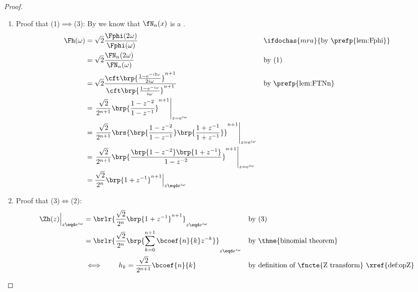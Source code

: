 \begin{proof}
\begin{enumerate}
  \item Proof that (1)$\implies$(3):
        By  we know that $\fN_n(x)$ is a .
        \begin{align*}
          \Fh(\omega)
            &= \sqrt{2}\frac{\Fphi(2\omega)}{\Fphi(\omega)}
            && \ifdochas{mra}{\text{by \prefp{lem:Fphi}}}
          \\&= \sqrt{2}\frac{\FN_n(2\omega)}{\FN_n(\omega)}
            && \text{by (1)}
          \\&= \sqrt{2}\frac{{\cft}\brp{\frac{1-e^{-i2\omega}}{2i\omega}}^{n+1}}
                            {{\cft}\brp{\frac{1-e^{-i\omega}}{i\omega}}^{n+1}}
            && \text{by \prefp{lem:FTNn}}
          \\&= \left.\frac{\sqrt{2}}{2^{n+1}}
               \brp{\frac{1-z^{-2}}{1-z^{-1}}}^{n+1}\right|_{z=e^{i\omega}}
          \\&= \left.\frac{\sqrt{2}}{2^{n+1}}
               \brs{\brp{\frac{1-z^{-2}}{1-z^{-1}}}
               \brp{\frac{1+z^{-1}}{1+z^{-1}}}}^{n+1}\right|_{z=e^{i\omega}}
          \\&= \left.\frac{\sqrt{2}}{2^{n+1}}
               \brp{\frac{ \brp{1-z^{-2}}  \brp{1+z^{-1}}}{1-z^{-2}}}^{n+1}\right|_{z=e^{i\omega}}
          \\&= \frac{\sqrt{2}}{2^n}\brp{1+z^{-1}}^{n+1}\Big|_{z\eqd e^{i\omega}}
        \end{align*}

  \item Proof that (3)$\iff$(2):\\
    \begin{align*}
      \Zh(z)\Big|_{z\eqd e^{i\omega}}
            &= \brlr{\frac{\sqrt{2}}{2^n}\brp{1+z^{-1}}^{n+1}}_{z\eqd e^{i\omega}}
            && \text{by (3)}
          \\&= \brlr{\frac{\sqrt{2}}{2^n}\brp{\sum_{k=0}^{n+1} \bcoef{n}{k} z^{-k}}}_{z\eqd e^{i\omega}}
            && \text{by \thme{binomial theorem}}
          \\&\iff \qquad h_k = \frac{\sqrt{2}}{2^{n+1}} \bcoef{n}{k}
            && \text{by definition of \fncte{Z transform} \xref{def:opZ}}
    \end{align*}


\end{enumerate}
\end{proof}
